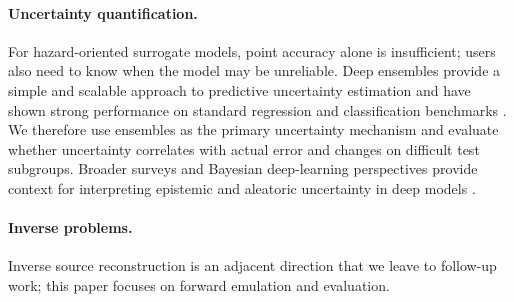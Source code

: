\paragraph{Uncertainty quantification.}
For hazard-oriented surrogate models, point accuracy alone is insufficient; users also need to know when the model may be unreliable. Deep ensembles provide a simple and scalable approach to predictive uncertainty estimation and have shown strong performance on standard regression and classification benchmarks \citep{lakshminarayanan2017deepensembles}. We therefore use ensembles as the primary uncertainty mechanism and evaluate whether uncertainty correlates with actual error and changes on difficult test subgroups. Broader surveys and Bayesian deep-learning perspectives provide context for interpreting epistemic and aleatoric uncertainty in deep models \citep{he2023uqsurvey,wilson2020bayesian}.

\paragraph{Inverse problems.}
Inverse source reconstruction is an adjacent direction that we leave to follow-up work; this paper focuses on forward emulation and evaluation.
